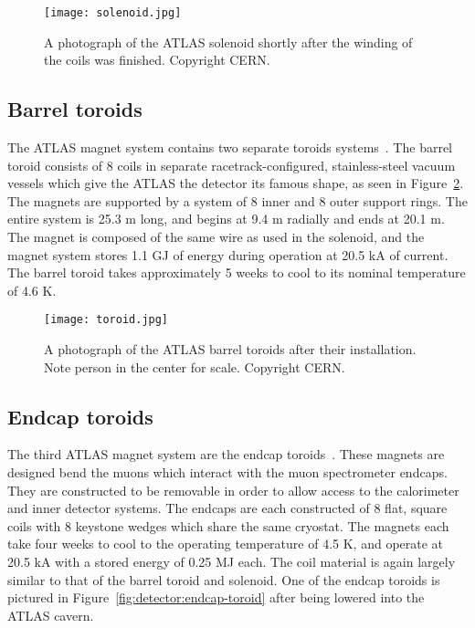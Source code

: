 
\begin{figure}
\centering
\texttt{[image: solenoid.jpg]}
\label{fig:detector:solenoid}
\caption{A photograph of the ATLAS solenoid shortly after the winding of the coils was finished. Copyright CERN.}
\end{figure}



\subsection{Barrel toroids}

The ATLAS magnet system contains two separate toroids systems~\cite{ATLASPaper}. The barrel toroid consists of 8 coils in separate racetrack-configured, stainless-steel vacuum vessels which give the ATLAS the detector its famous shape, as seen in Figure~\ref{fig:detector:toroid}. The magnets are supported by a system of 8 inner and 8 outer support rings. The entire system is 25.3 m long, and begins at 9.4 m radially and ends at 20.1 m. The magnet is composed of the same wire as used in the solenoid, and the magnet system stores 1.1 GJ of energy during operation at 20.5 kA of current. The barrel toroid takes approximately 5 weeks to cool to its nominal temperature of 4.6 K.



\begin{figure}
\centering
\texttt{[image: toroid.jpg]}
\label{fig:detector:toroid}
\caption{A photograph of the ATLAS barrel toroids after their installation. Note person in the center for scale. Copyright CERN.}
\end{figure}


\subsection{Endcap toroids}

The third ATLAS magnet system are the endcap toroids~\cite{ATLASPaper}. These magnets are designed bend the muons which interact with the muon spectrometer endcaps. They are constructed to be removable in order to allow access to the calorimeter and inner detector systems. The endcaps are each constructed of 8 flat, square coils with 8 keystone wedges which share the same cryostat. The magnets each take four weeks to cool to the operating temperature of 4.5 K, and operate at 20.5 kA with a stored energy of 0.25 MJ each. The coil material is again largely similar to that of the barrel toroid and solenoid. One of the endcap toroids is pictured in Figure~\ref{fig:detector:endcap-toroid} after being lowered into the ATLAS cavern.


